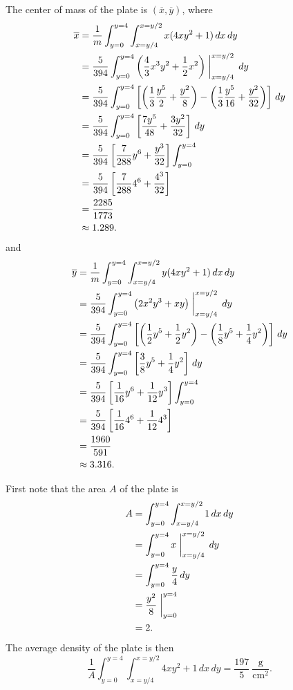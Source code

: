 \begin{exercises}
\begin{exerciseSolution}
	\item The center of mass of the plate is $(\overline{x}, \overline{y})$, where
\begin{align*}
\overline{x} &= \frac{1}{m} \int_{y=0}^{y=4} \int_{x=y/4}^{x=y/2} x(4xy^2 + 1) \, dx \, dy \\
	&= \frac{5}{394} \int_{y=0}^{y=4} \left(\frac{4}{3}x^3y^2+\frac{1}{2}x^2\right)\biggm|_{x=y/4}^{x=y/2} \, dy \\
	&= \frac{5}{394} \int_{y=0}^{y=4} \left[\left(\frac{1}{3}\frac{y^5}{2} + \frac{y^2}{8} \right) - \left(\frac{1}{3}\frac{y^5}{16}+\frac{y^2}{32} \right)  \right] \, dy \\
	&= \frac{5}{394} \int_{y=0}^{y=4} \left[\frac{7y^5}{48}+\frac{3y^2}{32} \right] \, dy \\
	&= \frac{5}{394} \left[\frac{7}{288}y^6 + \frac{y^3}{32} \right]  \int_{y=0}^{y=4}   \\
	&= \frac{5}{394} \left[\frac{7}{288}4^6 + \frac{4^3}{32}\right]     \\
	&= \frac{2285}{1773} \\
	&\approx 1.289.
\end{align*}
and
\begin{align*}
\overline{y} &= \frac{1}{m} \int_{y=0}^{y=4} \int_{x=y/4}^{x=y/2} y(4xy^2 + 1) \, dx \, dy \\
	&= \frac{5}{394} \int_{y=0}^{y=4} \left(2x^2y^3+xy\right)\biggm|_{x=y/4}^{x=y/2} \, dy \\
	&= \frac{5}{394} \int_{y=0}^{y=4} \left[\left(\frac{1}{2}y^5 + \frac{1}{2}y^2\right) - \left(\frac{1}{8}y^5+\frac{1}{4}y^2 \right)  \right] \, dy \\
	&= \frac{5}{394} \int_{y=0}^{y=4} \left[\frac{3}{8}y^5+\frac{1}{4}y^2 \right] \, dy \\
	&= \frac{5}{394} \left[\frac{1}{16}y^6 + \frac{1}{12}y^3 \right]  \int_{y=0}^{y=4}   \\
	&= \frac{5}{394} \left[\frac{1}{16}4^6 + \frac{1}{12}4^3 \right]     \\
	&= \frac{1960}{591} \\
	&\approx 3.316.
\end{align*}


	\item First note that the area $A$ of the plate is 
\begin{align*}
A &= \int_{y=0}^{y=4} \int_{x=y/4}^{x=y/2} 1 \, dx \, dy \\
	&= \int_{y=0}^{y=4} x\biggm|_{x=y/4}^{x=y/2}  \, dy \\
	&= \int_{y=0}^{y=4} \frac{y}{4}  \, dy \\
	&= \frac{y^2}{8}\biggm|_{y=0}^{y=4} \\
	&= 2.
\end{align*}
The average density of the plate is then 
\[\frac{1}{A} \int_{y=0}^{y=4} \int_{x=y/4}^{x=y/2} 4xy^2 + 1 \, dx \, dy = \frac{197}{5} \ \frac{\text{g}}{\text{cm}^2}.\]


\end{exerciseSolution}
\end{exercises}
